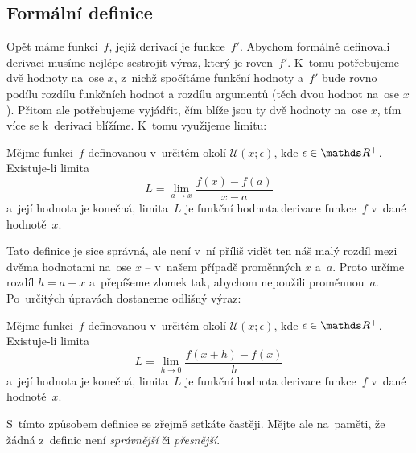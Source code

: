 \subsection{Formální definice}
\label{subsec:derivace-definice-formal}

Opět máme funkci~$f$, jejíž derivací je funkce~$f'$. Abychom formálně definovali
derivaci musíme nejlépe sestrojit výraz, který je roven~$f'$. K~tomu potřebujeme dvě
hodnoty na~ose $x$, z~nichž spočítáme funkční hodnoty a~$f'$ bude rovno podílu
rozdílu funkčních hodnot a rozdílu argumentů (těch dvou hodnot na~ose $x$). Přitom
ale potřebujeme vyjádřit, čím blíže jsou ty dvě hodnoty na~ose $x$, tím více se
k~derivaci blížíme. K~tomu využijeme limitu:

\begin{definition}
    Mějme funkci~$f$ definovanou v~určitém okolí ${\mathcal{U}(x; \epsilon)}$, kde
    ${\epsilon \in \reals^{+}}$. Existuje-li limita
    \begin{equation*}
        L = \lim_{a \to x} \frac{f(x) - f(a)}{x - a}
    \end{equation*}
    a~její hodnota je konečná, limita~$L$ je funkční hodnota derivace funkce~$f$
    v~dané hodnotě~$x$.
\end{definition}

Tato definice je sice správná, ale není v~ní příliš vidět ten náš malý rozdíl mezi
dvěma hodnotami na~ose $x$ -- v~našem případě proměnných $x$ a~$a$. Proto určíme
rozdíl $h = a - x$ a~přepíšeme zlomek tak, abychom nepoužili proměnnou~$a$.
Po~určitých úpravách dostaneme odlišný výraz:

\begin{definition}
    Mějme funkci~$f$ definovanou v~určitém okolí ${\mathcal{U}(x; \epsilon)}$, kde
    ${\epsilon \in \reals^{+}}$. Existuje-li limita
    \begin{equation*}
        L = \lim_{h \to 0} \frac{f(x + h) - f(x)}{h}
    \end{equation*}
    a~její hodnota je konečná, limita~$L$ je funkční hodnota derivace funkce~$f$
    v~dané hodnotě~$x$.
\end{definition}

S~tímto způsobem definice se zřejmě setkáte častěji. Mějte ale na~paměti, že žádná
z~definic není \emph{správnější} či \emph{přesnější}.